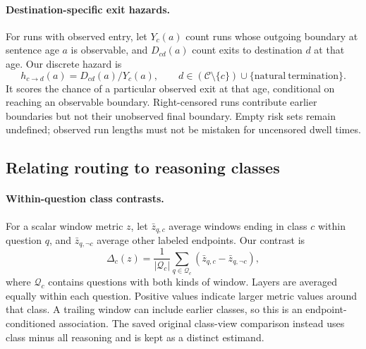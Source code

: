 \paragraph{Destination-specific exit hazards.}
For runs with observed entry, let $Y_c(a)$ count runs whose outgoing boundary at
sentence age $a$ is observable, and $D_{cd}(a)$ count exits to destination $d$ at
that age. Our discrete hazard is
\begin{equation}
 h_{c\rightarrow d}(a)=D_{cd}(a)/Y_c(a),
 \qquad d\in(\mathcal C\setminus\{c\})\cup\{\mathrm{natural\ termination}\}.
 \label{eq:new-hazard}
\end{equation}
It scores the chance of a particular observed exit at that age, conditional on
reaching an observable boundary. Right-censored runs contribute earlier
boundaries but not their unobserved final boundary. Empty risk sets remain
undefined; observed run lengths must not be mistaken for uncensored dwell times.

\subsection{Relating routing to reasoning classes}

\paragraph{Within-question class contrasts.}
For a scalar window metric $z$, let $\bar z_{q,c}$ average windows ending in
class $c$ within question $q$, and $\bar z_{q,\neg c}$ average other labeled
endpoints. Our contrast is
\begin{equation}
 \Delta_c(z)=\frac{1}{|\mathcal Q_c|}
 \sum_{q\in\mathcal Q_c}(\bar z_{q,c}-\bar z_{q,\neg c}),
 \label{eq:new-class-contrast}
\end{equation}
where $\mathcal Q_c$ contains questions with both kinds of window. Layers are
averaged equally within each question. Positive values indicate larger metric
values around that class. A trailing window can include earlier classes, so this
is an endpoint-conditioned association. The saved original class-view comparison
instead uses class minus all reasoning and is kept as a distinct estimand.

